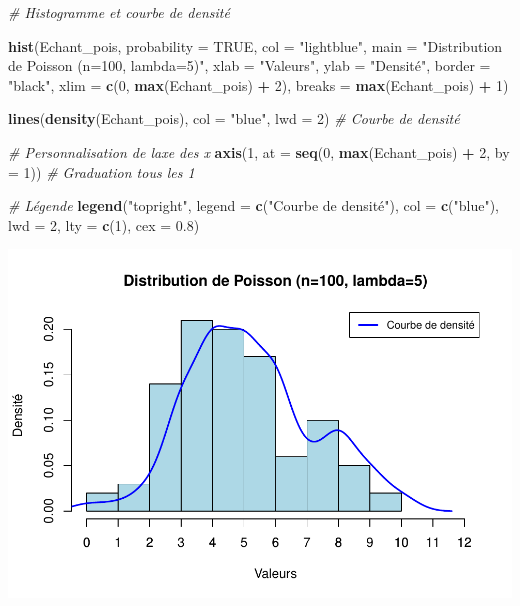 \documentclass[
  12pt,
]{article}
\newenvironment{Shaded}{\begin{snugshade}}{\end{snugshade}}
\newcommand{\AttributeTok}[1]{\textcolor[rgb]{0.13,0.29,0.53}{#1}}
\newcommand{\CommentTok}[1]{\textcolor[rgb]{0.56,0.35,0.01}{\textit{#1}}}
\newcommand{\ConstantTok}[1]{\textcolor[rgb]{0.56,0.35,0.01}{#1}}
\newcommand{\DecValTok}[1]{\textcolor[rgb]{0.00,0.00,0.81}{#1}}
\newcommand{\FloatTok}[1]{\textcolor[rgb]{0.00,0.00,0.81}{#1}}
\newcommand{\FunctionTok}[1]{\textcolor[rgb]{0.13,0.29,0.53}{\textbf{#1}}}
\newcommand{\NormalTok}[1]{#1}
\newcommand{\SpecialCharTok}[1]{\textcolor[rgb]{0.81,0.36,0.00}{\textbf{#1}}}
\newcommand{\StringTok}[1]{\textcolor[rgb]{0.31,0.60,0.02}{#1}}
\begin{document}
\begin{Shaded}
\begin{Highlighting}[]
\CommentTok{\# Histogramme et courbe de densité}

\FunctionTok{hist}\NormalTok{(Echant\_pois, }\AttributeTok{probability =} \ConstantTok{TRUE}\NormalTok{, }\AttributeTok{col =} \StringTok{"lightblue"}\NormalTok{, }
     \AttributeTok{main =} \StringTok{"Distribution de Poisson (n=100, lambda=5)"}\NormalTok{,}
     \AttributeTok{xlab =} \StringTok{"Valeurs"}\NormalTok{, }\AttributeTok{ylab =} \StringTok{"Densité"}\NormalTok{, }\AttributeTok{border =} \StringTok{"black"}\NormalTok{,}
     \AttributeTok{xlim =} \FunctionTok{c}\NormalTok{(}\DecValTok{0}\NormalTok{, }\FunctionTok{max}\NormalTok{(Echant\_pois) }\SpecialCharTok{+} \DecValTok{2}\NormalTok{), }\AttributeTok{breaks =} \FunctionTok{max}\NormalTok{(Echant\_pois) }\SpecialCharTok{+} \DecValTok{1}\NormalTok{)  }

\FunctionTok{lines}\NormalTok{(}\FunctionTok{density}\NormalTok{(Echant\_pois), }\AttributeTok{col =} \StringTok{"blue"}\NormalTok{, }\AttributeTok{lwd =} \DecValTok{2}\NormalTok{) }\CommentTok{\# Courbe de densité  }

\CommentTok{\# Personnalisation de l\textquotesingle{}axe des x}
\FunctionTok{axis}\NormalTok{(}\DecValTok{1}\NormalTok{, }\AttributeTok{at =} \FunctionTok{seq}\NormalTok{(}\DecValTok{0}\NormalTok{, }\FunctionTok{max}\NormalTok{(Echant\_pois) }\SpecialCharTok{+} \DecValTok{2}\NormalTok{, }\AttributeTok{by =} \DecValTok{1}\NormalTok{))  }\CommentTok{\# Graduation tous les 1}

\CommentTok{\# Légende}
\FunctionTok{legend}\NormalTok{(}\StringTok{"topright"}\NormalTok{, }\AttributeTok{legend =} \FunctionTok{c}\NormalTok{(}\StringTok{"Courbe de densité"}\NormalTok{), }
       \AttributeTok{col =} \FunctionTok{c}\NormalTok{(}\StringTok{"blue"}\NormalTok{), }\AttributeTok{lwd =} \DecValTok{2}\NormalTok{, }\AttributeTok{lty =} \FunctionTok{c}\NormalTok{(}\DecValTok{1}\NormalTok{), }\AttributeTok{cex =} \FloatTok{0.8}\NormalTok{)}
\end{Highlighting}
\end{Shaded}

\includegraphics{Stat_non_para_files/figure-latex/unnamed-chunk-5-1.pdf}
\end{document}
